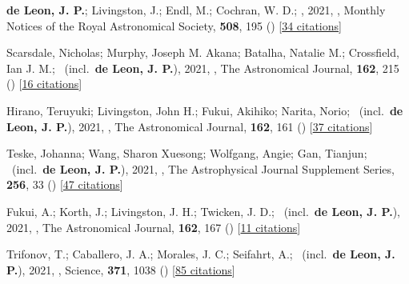 \item[{\color{numcolor}\scriptsize39}] \textbf{de Leon, J. P.}; Livingston, J.; Endl, M.; Cochran, W. D.; \etal, 2021, , Monthly Notices of the Royal Astronomical Society, \textbf{508}, 195 () [\href{https://ui.adsabs.harvard.edu/abs/2021MNRAS.508..195D}{34 citations}]

\item[{\color{numcolor}\scriptsize38}] Scarsdale, Nicholas; Murphy, Joseph M. Akana; Batalha, Natalie M.; Crossfield, Ian J. M.; \etal\ (incl.\ \textbf{de Leon, J. P.}), 2021, , The Astronomical Journal, \textbf{162}, 215 () [\href{https://ui.adsabs.harvard.edu/abs/2021AJ....162..215S}{16 citations}]

\item[{\color{numcolor}\scriptsize37}] Hirano, Teruyuki; Livingston, John H.; Fukui, Akihiko; Narita, Norio; \etal\ (incl.\ \textbf{de Leon, J. P.}), 2021, , The Astronomical Journal, \textbf{162}, 161 () [\href{https://ui.adsabs.harvard.edu/abs/2021AJ....162..161H}{37 citations}]

\item[{\color{numcolor}\scriptsize36}] Teske, Johanna; Wang, Sharon Xuesong; Wolfgang, Angie; Gan, Tianjun; \etal\ (incl.\ \textbf{de Leon, J. P.}), 2021, , The Astrophysical Journal Supplement Series, \textbf{256}, 33 () [\href{https://ui.adsabs.harvard.edu/abs/2021ApJS..256...33T}{47 citations}]

\item[{\color{numcolor}\scriptsize35}] Fukui, A.; Korth, J.; Livingston, J. H.; Twicken, J. D.; \etal\ (incl.\ \textbf{de Leon, J. P.}), 2021, , The Astronomical Journal, \textbf{162}, 167 () [\href{https://ui.adsabs.harvard.edu/abs/2021AJ....162..167F}{11 citations}]

\item[{\color{numcolor}\scriptsize34}] Trifonov, T.; Caballero, J. A.; Morales, J. C.; Seifahrt, A.; \etal\ (incl.\ \textbf{de Leon, J. P.}), 2021, , Science, \textbf{371}, 1038 () [\href{https://ui.adsabs.harvard.edu/abs/2021Sci...371.1038T}{85 citations}]

